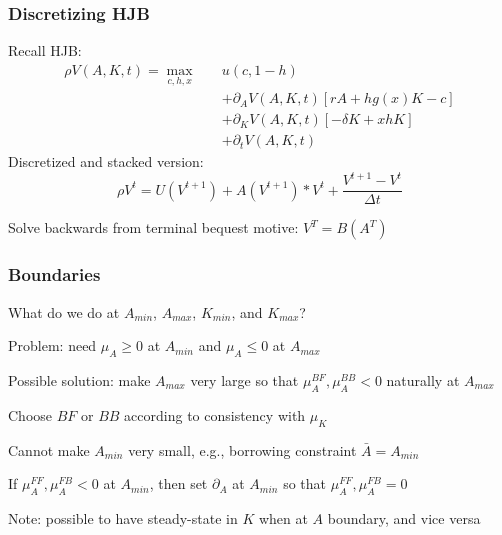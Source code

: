 \documentclass[aspectratio=169]{beamer}
\newenvironment{wideitemize}{\itemize\addtolength{\itemsep}{10pt}}{\enditemize}
\begin{document}
\begin{frame}
    \frametitle{Discretizing HJB}
    Recall HJB:
    \begin{align*}
        \rho V(A, K, t) = \max_{c, h, x} \quad &u(c, 1-h) \\
        &+ \partial_A V(A, K, t) \left[rA + h g(x) K - c \right] \\
        &+ \partial_K V(A, K, t) \left[-\delta K + x h K \right] \\
        &+ \partial_t V(A, K, t)
    \end{align*}
    Discretized and stacked version:
    \begin{equation}
        \rho V^{t} = U(V^{t+1}) + A(V^{t+1}) * V^{t} + \frac{V^{t+1} - V^{t}}{\Delta t}
    \end{equation}
    \begin{wideitemize}
        \item Solve backwards from terminal bequest motive: $V^T = B(A^T)$
    \end{wideitemize}
    
\end{frame}

\begin{frame}
    \frametitle{Boundaries}

    \begin{wideitemize}
        \item What do we do at $A_{min}$, $A_{max}$, $K_{min}$, and $K_{max}$?
        \item Problem: need $\mu_{A} \geq 0$ at $A_{min}$ and $\mu_{A} \leq 0$ at $A_{max}$
        \item Possible solution: make $A_{max}$ very large so that $\mu_{A}^{BF}, \mu_{A}^{BB} < 0$ naturally at $A_{max}$
        \item Choose $BF$ or $BB$ according to consistency with $\mu_{K}$
        \item Cannot make $A_{min}$ very small, e.g., borrowing constraint $\bar{A} = A_{min}$
        \item If $\mu_A^{FF}, \mu_A^{FB} < 0$ at $A_{min}$, then set $\partial_A$ at $A_{min}$ so that $\mu_A^{FF}, \mu_A^{FB} = 0$
        \item Note: possible to have steady-state in $K$ when at $A$ boundary, and vice versa
    \end{wideitemize}

\end{frame}
\end{document}
